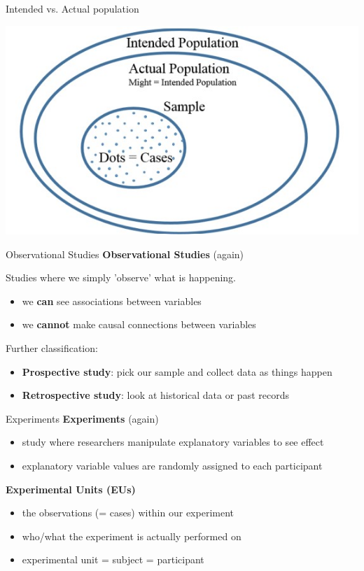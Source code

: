 \documentclass{beamer}
\begin{document}
\begin{frame}{Intended vs. Actual population}
\begin{center}
    \includegraphics[]{img/actual_intended_pop.jpg}
\end{center}
\end{frame}


\begin{frame}{Observational Studies}
\textbf{Observational Studies} (again)

Studies where we simply 'observe' what is happening.
\begin{itemize}
    \item we \textbf{can} see associations between variables
    \item we \textbf{cannot} make causal connections between variables
\end{itemize} \vspace{6mm}

Further classification:
\begin{itemize}
    \item \textbf{Prospective study}: pick our sample and collect data as things happen
    \item \textbf{Retrospective study}: look at historical data or past records
\end{itemize}
\end{frame}



\begin{frame}{Experiments}
\textbf{Experiments} (again)
\begin{itemize}
    \item study where researchers manipulate explanatory variables to see effect
    \item explanatory variable values are randomly assigned to each participant
\end{itemize} \vspace{6mm}

\textbf{Experimental Units (EUs)}
\begin{itemize}
    \item the observations (= cases) within our experiment
    \item who/what the experiment is actually performed on
    \item experimental unit = subject = participant
\end{itemize}
\end{frame}
\end{document}
